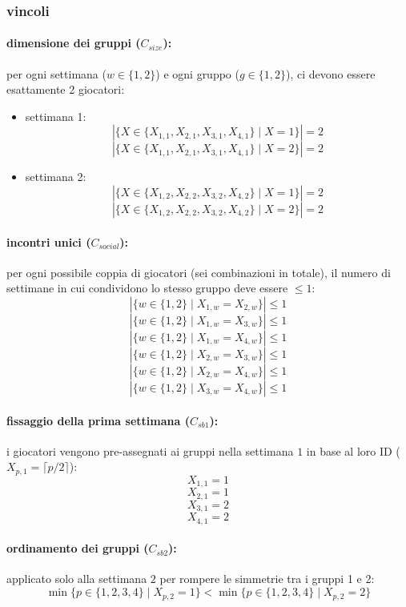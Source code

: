 \documentclass[12pt]{article}
\begin{document}
\subsubsection*{vincoli}

\paragraph{dimensione dei gruppi ($C_{size}$):}
per ogni settimana ($w \in \{1,2\}$) e ogni gruppo ($g \in \{1,2\}$), ci devono essere esattamente 2 giocatori:
\begin{itemize}
    \item settimana 1:
    $$|\{ X \in \{X_{1,1}, X_{2,1}, X_{3,1}, X_{4,1}\} \mid X = 1 \}| = 2$$
    $$|\{ X \in \{X_{1,1}, X_{2,1}, X_{3,1}, X_{4,1}\} \mid X = 2 \}| = 2$$
    \item settimana 2:
    $$|\{ X \in \{X_{1,2}, X_{2,2}, X_{3,2}, X_{4,2}\} \mid X = 1 \}| = 2$$
    $$|\{ X \in \{X_{1,2}, X_{2,2}, X_{3,2}, X_{4,2}\} \mid X = 2 \}| = 2$$
\end{itemize}

\paragraph{incontri unici ($C_{social}$):}
per ogni possibile coppia di giocatori (sei combinazioni in totale), il numero di settimane in cui condividono lo stesso gruppo deve essere $\le 1$:
    $$|\{ w \in \{1, 2\} \mid X_{1,w} = X_{2,w} \}| \le 1$$
    $$|\{ w \in \{1, 2\} \mid X_{1,w} = X_{3,w} \}| \le 1$$
    $$|\{ w \in \{1, 2\} \mid X_{1,w} = X_{4,w} \}| \le 1$$
    $$|\{ w \in \{1, 2\} \mid X_{2,w} = X_{3,w} \}| \le 1$$
    $$|\{ w \in \{1, 2\} \mid X_{2,w} = X_{4,w} \}| \le 1$$
    $$|\{ w \in \{1, 2\} \mid X_{3,w} = X_{4,w} \}| \le 1$$

\paragraph{fissaggio della prima settimana ($C_{sb1}$):}
i giocatori vengono pre-assegnati ai gruppi nella settimana $1$ in base al loro ID ($X_{p,1} = \lceil p/2 \rceil$):
$$X_{1,1} = 1$$
$$X_{2,1} = 1$$
$$X_{3,1} = 2$$
$$X_{4,1} = 2$$

\paragraph{ordinamento dei gruppi ($C_{sb2}$):}
applicato solo alla settimana $2$ per rompere le simmetrie tra i gruppi 1 e 2:
$$\min \{ p \in \{1, 2, 3, 4\} \mid X_{p,2} = 1 \} < \min \{ p \in \{1, 2, 3, 4\} \mid X_{p,2} = 2 \}$$
\end{document}
